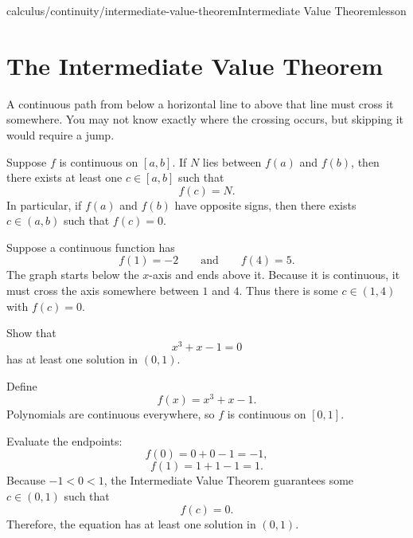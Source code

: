 \begin{webpage}{calculus/continuity/intermediate-value-theorem}{Intermediate Value Theorem}{lesson}
\section{The Intermediate Value Theorem}


\begin{bgconcept}
A continuous path from below a horizontal line to above that line must cross it somewhere. You may not know exactly where the crossing occurs, but skipping it would require a jump.
\end{bgconcept}

\begin{bgtheorem}[title={Intermediate Value Theorem}]
Suppose \(f\) is continuous on \([a,b]\). If \(N\) lies between \(f(a)\) and \(f(b)\), then there exists at least one \(c\in[a,b]\) such that
\[
  \boxed{f(c)=N}.
\]
In particular, if \(f(a)\) and \(f(b)\) have opposite signs, then there exists \(c\in(a,b)\) such that \(f(c)=0\).
\end{bgtheorem}

\begin{bgguided}[title={Crossing ground level}]
Suppose a continuous function has
\[
  f(1)=-2
  \qquad\text{and}\qquad
  f(4)=5.
\]
The graph starts below the \(x\)-axis and ends above it. Because it is continuous, it must cross the axis somewhere between \(1\) and \(4\). Thus there is some \(c\in(1,4)\) with \(f(c)=0\).
\end{bgguided}



\begin{bgexample}[title={Prove a polynomial has a root}]
Show that
\[
  x^3+x-1=0
\]
has at least one solution in \((0,1)\).

\begin{bgsolution}
Define
\[
  f(x)=x^3+x-1.
\]
Polynomials are continuous everywhere, so \(f\) is continuous on \([0,1]\).

Evaluate the endpoints:
\[
  f(0)=0+0-1=-1,
\]
\[
  f(1)=1+1-1=1.
\]
Because \(-1<0<1\), the Intermediate Value Theorem guarantees some \(c\in(0,1)\) such that
\[
  f(c)=0.
\]
Therefore, the equation has at least one solution in \((0,1)\).
\end{bgsolution}
\end{bgexample}


\end{webpage}
